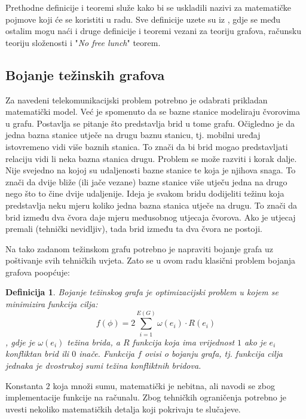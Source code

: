 \documentclass[times, utf8, diplomski, numeric]{fer}
\newtheorem{definition}{Definicija}
\begin{document}
Prethodne definicije i teoremi služe kako bi se uskladili nazivi za matematičke pojmove koji će se koristiti u radu. Sve definicije uzete su iz \cite{lit16, lit15, lit19}, gdje se među ostalim mogu naći i druge definicije i teoremi vezani za teoriju grafova, računsku teoriju složenosti i "\emph{No free lunch}" teorem.

\subsection{Bojanje težinskih grafova}

Za navedeni telekomunikacijski problem potrebno je odabrati prikladan matematički model. Već je spomenuto da se bazne stanice modeliraju čvorovima u grafu. Postavlja se pitanje što predstavlja brid u tome grafu. Očigledno je da jedna bazna stanice utječe na drugu baznu stanicu, tj. mobilni uređaj istovremeno vidi više baznih stanica. To znači da bi brid mogao predstavljati relaciju vidi li neka bazna stanica drugu. Problem se može razviti i korak dalje. Nije svejedno na kojoj su udaljenosti bazne stanice te koja je njihova snaga. To znači da dvije bliže (ili jače vezane) bazne stanice više utječu jedna na drugo nego što to čine dvije udaljenije. Ideja je svakom bridu dodijeliti težinu koja predstavlja neku mjeru koliko jedna bazna stanica utječe na drugu. To znači da brid između dva čvora daje mjeru međusobnog utjecaja čvorova. Ako je utjecaj premali (tehnički nevidljiv), tada brid između ta dva čvora ne postoji.

Na tako zadanom težinskom grafu potrebno je napraviti bojanje grafa uz poštivanje svih tehničkih uvjeta. Zato se u ovom radu klasični problem bojanja grafova poopćuje:

\begin{definition}
Bojanje težinskog grafa je optimizacijski problem u kojem se minimizira funkcija cilja:
\begin{equation}
f(\phi) = 2\sum_{i=1}^{E(G)} \omega(e_i) \cdot R(e_i)
\end{equation}
, gdje je $\omega(e_i)$ težina brida, a $R$ funkcija koja ima vrijednost $1$ ako je $e_i$ konfliktan brid ili $0$ inače. Funkcija $f$ ovisi o bojanju grafa, tj. funkcija cilja jednaka je dvostrukoj sumi težina konfliktnih bridova.
\end{definition}

Konstanta $2$ koja množi sumu, matematički je nebitna, ali navodi se zbog implementacije funkcije na računalu. Zbog tehničkih ograničenja potrebno je uvesti nekoliko matematičkih detalja koji pokrivaju te slučajeve.
\end{document}

